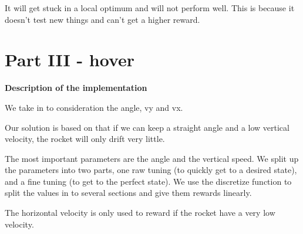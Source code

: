 \documentclass[12pt,a4paper]{article}
\begin{document}
It will get stuck in a local optimum and will not perform well. This is because it doesn't test new things and can't get a higher reward.

\section {Part III - hover}
\textbf{Description of the implementation}

We take in to consideration the angle, vy and vx.

Our solution is based on that if we can keep a straight angle and a low vertical velocity, the rocket will only drift very little.

The most important parameters are the angle and the vertical speed. We split up the parameters into two parts, one raw tuning (to quickly get to a desired state), and a fine tuning (to get to the perfect state). We use the discretize function to split the values in to several sections and give them rewards linearly.

The horizontal velocity is only used to reward if the rocket have a very low velocity. 
\end{document}
